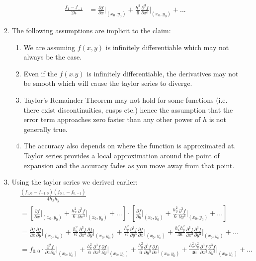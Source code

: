 \documentclass[12pt]{article}
\begin{document}
\begin{enumerate}
\begin{enumerate}
\begin{align*}
            \frac{f_{1}-f_{-1}}{2h}&=\boxed{\frac{\partial f}{\partial x}\bigg|_{(x_0,y_0)}+\frac{h^2}{6}\frac{\partial^3 f}{\partial x^3}\bigg|_{(x_0,y_0)}+...}
        \end{align*}
        \newpage
        \item The following assumptions are implicit to the claim:
        \begin{enumerate}
            \item We are assuming $f(x,y)$ is infinitely differentiable which may not always be the case.
            \item Even if the $f(x.y)$ is infinitely differentiable, the derivatives may not be smooth which will cause the taylor series to diverge.
            \item Taylor's Remainder Theorem may not hold for some functions (i.e. there exist discontinuities, cusps etc.) hence the assumption that the error term approaches zero faster than any other power of $h$ is not generally true.
            \item The accuracy also depends on where the function is approximated at. Taylor series provides a local approximation around the point of expansion and the accuracy fades as you move away from that point.
        \end{enumerate}
        \newpage
        \item
        Using the taylor series we derived earlier:
        \begin{align*}
            &\frac{(f_{1,0}-f_{-1,0})(f_{0,1}-f_{0,-1})}{4h_xh_y}\\ 
            &= \left[\frac{\partial f}{\partial x}\bigg|_{(x_0,y_0)}+\frac{h_x^2}{6}\frac{\partial^3f}{\partial x^3}\bigg|_{(x_0,y_0)}+...\right]\cdot\left[\frac{\partial f}{\partial y}\bigg|_{(x_0,y_0)}+\frac{h_y^2}{6}\frac{\partial^3f}{\partial y^3}\bigg|_{(x_0,y_0)}+...\right]\\
            &=\frac{\partial f}{\partial x}\frac{\partial f}{\partial y}\bigg|_{(x_0,y_0)}+\frac{h_x^2}{6}\frac{\partial^3f}{\partial x^3}\frac{\partial f}{\partial y}\bigg|_{(x_0,y_0)}+\frac{h_y^2}{6}\frac{\partial^3f}{\partial y^3}\frac{\partial f}{\partial x}\bigg|_{(x_0,y_0)}+\frac{h_x^2h_y^2}{36}\frac{\partial^3f}{\partial x^3}\frac{\partial^3f}{\partial y^3}\bigg|_{(x_0,y_0)}+...\\
            &=f_{0,0}\cdot\frac{\partial^2f}{\partial x\partial y}\bigg|_{(x_0,y_0)}+\frac{h_x^2}{6}\frac{\partial^3f}{\partial x^3}\frac{\partial f}{\partial y}\bigg|_{(x_0,y_0)}+\frac{h_y^2}{6}\frac{\partial^3f}{\partial y^3}\frac{\partial f}{\partial x}\bigg|_{(x_0,y_0)}+\frac{h_x^2h_y^2}{36}\frac{\partial^3f}{\partial x^3}\frac{\partial^3f}{\partial y^3}\bigg|_{(x_0,y_0)}+...

\end{align*}
\end{enumerate}
\end{enumerate}
\end{document}
